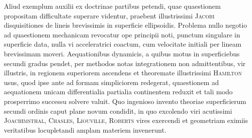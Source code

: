 \documentclass[11pt]{article}
\newcommand{\scn}[1]{\textsc{#1}}
\begin{document}
Aliud exemplum auxilii ex doctrinae partibus petendi, quae quaestionem propositam difficultate superare videntur, praebent illustrissimi \scn{Jacobi} disquisitiones de lineis brevissimis in superficie ellipsoidis. Problema nullo negotio ad quaestionem mechanicam revocatur ope principii noti, punctum singulare in superficie data, nulla vi acceleratrici coactum, cum velocitate initiali per lineam brevissimam moveri. Aequationibus dynamicis, a quibus motus in superficiebus secundi gradus pendet, per methodos notas integrationem non admittentibus, vir illustris, in regionem superiorem ascendens et theoremate illustrissimi \scn{Hamilton} usus, quod ipse ante ad formam simpliciorem redegerat, quaestionem ad aequationem unicam differentialia partialia continentem reduxit et tali modo prosperrimo successu solvere valuit. Quo ingenioso invento theoriae superficierum secundi ordinis caput plane novum condidit, in quo excolendo viri acutissimi \scn{Joachimsthal}, \scn{Chasles}, \scn{Liouville}, \scn{Roberts} vires exercendi et geometriam eximiis veritatibus locupletandi amplam materiem invenerunt.
\end{document}
